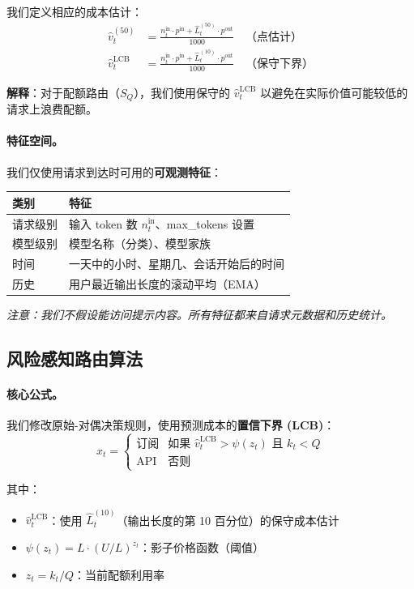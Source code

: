\documentclass[11pt]{article}
\begin{document}
我们定义相应的成本估计：
\begin{align}
  \hat{v}^{(50)}_t &= \frac{n^{\text{in}}_t \cdot p^{\text{in}} + \hat{L}^{(50)}_t \cdot p^{\text{out}}}{1000} \quad \text{（点估计）} \\
  \hat{v}^{\text{LCB}}_t &= \frac{n^{\text{in}}_t \cdot p^{\text{in}} + \hat{L}^{(10)}_t \cdot p^{\text{out}}}{1000} \quad \text{（保守下界）}
\end{align}

\textbf{解释}：对于配额路由（$S_Q$），我们使用保守的 $\hat{v}^{\text{LCB}}_t$ 以避免在实际价值可能较低的请求上浪费配额。

\paragraph{特征空间。}
我们仅使用请求到达时可用的\textbf{可观测特征}：
\begin{center}
\begin{tabular}{|l|l|}
\hline
\textbf{类别} & \textbf{特征} \\
\hline
请求级别 & 输入 token 数 $n^{\text{in}}_t$、max\_tokens 设置 \\
模型级别 & 模型名称（分类）、模型家族 \\
时间 & 一天中的小时、星期几、会话开始后的时间 \\
历史 & 用户最近输出长度的滚动平均（EMA）\\
\hline
\end{tabular}
\end{center}
\emph{注意：我们不假设能访问提示内容。所有特征都来自请求元数据和历史统计。}

\subsection{风险感知路由算法}

\paragraph{核心公式。}
我们修改原始-对偶决策规则，使用预测成本的\textbf{置信下界 (LCB)}：
\[
x_t =
\begin{cases}
\text{订阅} & \text{如果 } \hat{v}^{\text{LCB}}_t > \psi(z_t) \text{ 且 } k_t < Q \\[5pt]
\text{API} & \text{否则}
\end{cases}
\]

其中：
\begin{itemize}
  \item $\hat{v}^{\text{LCB}}_t$：使用 $\hat{L}^{(10)}_t$（输出长度的第 10 百分位）的保守成本估计
  \item $\psi(z_t) = L \cdot (U/L)^{z_t}$：影子价格函数（阈值）
  \item $z_t = k_t / Q$：当前配额利用率
\end{itemize}
\end{document}
